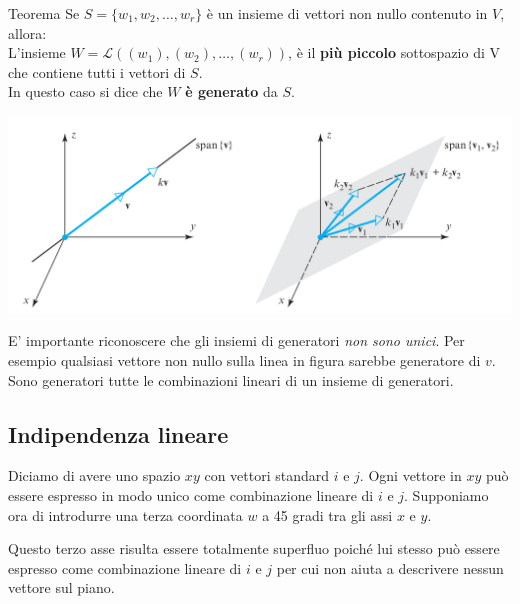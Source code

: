 \documentclass[x11names]{article}
\begin{document}
\begin{center}
\colorbox{myred}{\begin{minipage}{5.75in}
\begin{redes}{Teorema}
Se $S=\{w_1,w_2,\dots,w_{r}\}$ è un insieme di vettori non nullo contenuto in $V$, allora:  \\
L'insieme  $W = \mathscr{L}\left(\left(w_1\right),\left(w_2\right),\dots,\left(w_{r}\right)\right)$, è il \textbf{più piccolo} sottospazio di V che contiene tutti i vettori di $S$. \\
In questo caso si dice che  $W$  \textbf{è generato} da $S$.
\end{redes}
\end{minipage}}        
\end{center}

\begin{center}
\includegraphics[scale=0.3]{figures/span.png}
\end{center}

\noindent
E' importante riconoscere che gli insiemi di generatori \textit{non sono unici}. Per esempio qualsiasi vettore non nullo sulla linea in figura sarebbe generatore  di $v$. Sono generatori tutte le combinazioni lineari di un insieme di generatori.

\subsection{Indipendenza lineare}
Diciamo di avere uno spazio $xy$ con vettori standard $i$ e $j$. Ogni vettore in $xy$ può essere espresso in modo unico come combinazione lineare di $i$ e $j$. Supponiamo ora di introdurre una terza coordinata $w$ a 45 gradi tra gli assi $x$ e $y$. 

Questo terzo asse risulta essere totalmente superfluo poiché lui stesso può essere espresso come combinazione lineare di $i$ e $j$ per cui non aiuta a descrivere nessun vettore sul piano.
\end{document}
